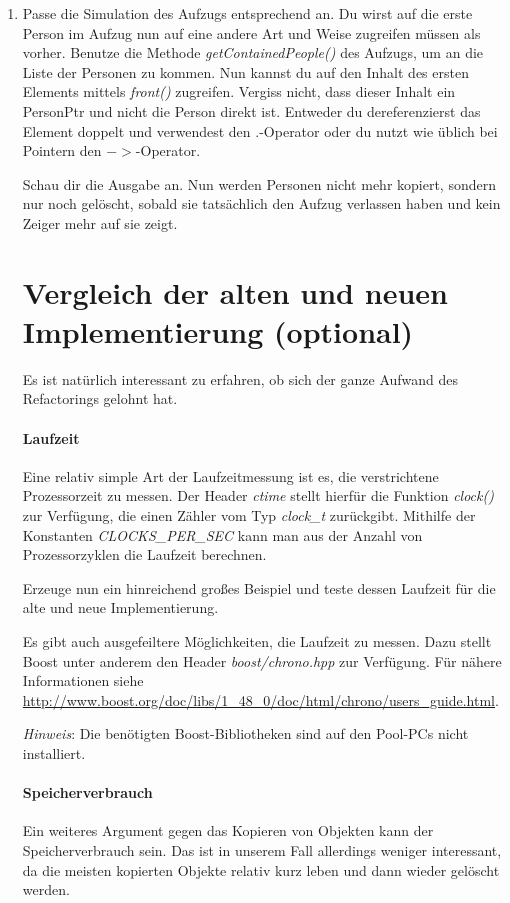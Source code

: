 \begin{enumerate}
\item
Passe die Simulation des Aufzugs entsprechend an.
Du wirst auf die erste Person im Aufzug nun auf eine andere Art und Weise zugreifen müssen als vorher.
Benutze die Methode \emph{getContainedPeople()} des Aufzugs, um an die Liste der Personen zu kommen.
Nun kannst du auf den Inhalt des ersten Elements mittels \emph{front()} zugreifen.
Vergiss nicht, dass dieser Inhalt ein PersonPtr und nicht die Person direkt ist.
Entweder du dereferenzierst das Element doppelt und verwendest den $.$-Operator oder du nutzt wie üblich bei Pointern den $->$-Operator.

Schau dir die Ausgabe an.
Nun werden Personen nicht mehr kopiert, sondern nur noch gelöscht, sobald sie tatsächlich den Aufzug verlassen haben und kein Zeiger mehr auf sie zeigt.

\section{Vergleich der alten und neuen Implementierung (optional)}

Es ist natürlich interessant zu erfahren, ob sich der ganze Aufwand des Refactorings gelohnt hat.

\paragraph{Laufzeit}
Eine relativ simple Art der Laufzeitmessung ist es, die verstrichtene Prozessorzeit zu messen.
Der Header \emph{ctime} stellt hierfür die Funktion \emph{clock()} zur Verfügung, die einen Zähler vom Typ \emph{clock\_t} zurückgibt.
Mithilfe der Konstanten \emph{CLOCKS\_PER\_SEC} kann man aus der Anzahl von Prozessorzyklen die Laufzeit berechnen.

Erzeuge nun ein hinreichend großes Beispiel und teste dessen Laufzeit für die alte und neue Implementierung.

Es gibt auch ausgefeiltere Möglichkeiten, die Laufzeit zu messen.
Dazu stellt Boost unter anderem den Header \emph{boost/chrono.hpp} zur Verfügung.
Für nähere Informationen siehe \url{http://www.boost.org/doc/libs/1_48_0/doc/html/chrono/users_guide.html}.

\emph{Hinweis}: Die benötigten Boost-Bibliotheken sind auf den Pool-PCs nicht installiert.

\paragraph{Speicherverbrauch}
Ein weiteres Argument gegen das Kopieren von Objekten kann der Speicherverbrauch sein.
Das ist in unserem Fall allerdings weniger interessant, da die meisten kopierten Objekte relativ kurz leben und dann wieder gelöscht werden.


\end{enumerate}
